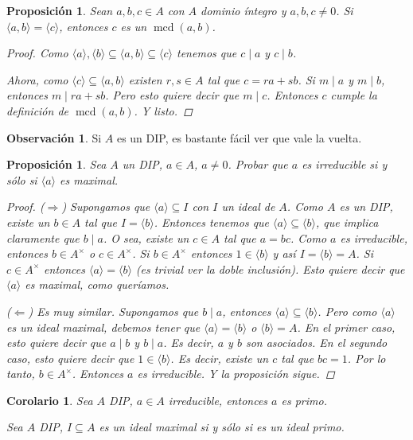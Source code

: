 \documentclass[12pt]{book}
\newtheorem{prop}[teo]{Proposición}
\newtheorem{cor}[teo]{Corolario}
\theoremstyle{definition}
\newtheorem{obs}[teo]{Observación}
\DeclareMathOperator{\mcd}{mcd}
\begin{document}
\begin{prop}
Sean $a,b,c\in A$ con $A$ dominio íntegro y $a,b,c\neq 0$. Si $\langle a,b\rangle = \langle c\rangle$, entonces $c$ es un $\mcd (a,b)$.
\begin{proof}
Como $\langle a\rangle , \langle b\rangle\subseteq \langle a,b\rangle \subseteq \langle c\rangle$ tenemos que $c\mid a$ y $c\mid b$.

Ahora, como $\langle c\rangle \subseteq \langle a,b\rangle$ existen $r,s\in A$ tal que $c=ra+sb$. Si $m\mid a$ y $m\mid b$, entonces $m\mid ra+sb$. Pero esto quiere decir que $m\mid c$. Entonces $c$ cumple la definición de $\mcd (a,b)$. Y listo.
\end{proof}
\end{prop}

\begin{obs}
Si $A$ es un DIP, es bastante fácil ver que vale la vuelta.
\end{obs}

\begin{prop}
Sea $A$ un DIP, $a\in A$, $a\neq 0$. Probar que $a$ es irreducible si y sólo si $\langle a\rangle$ es maximal.
\begin{proof}
($\Longrightarrow$) Supongamos que $\langle a\rangle \subseteq I$ con $I$ un ideal de $A$. Como $A$ es un DIP, existe un $b\in A$ tal que $I=\langle b\rangle$. Entonces tenemos que $\langle a\rangle \subseteq \langle b\rangle$, que implica claramente que $b\mid a$. O sea, existe un $c\in A$ tal que $a=bc$. Como $a$ es irreducible, entonces $b\in A^\times$ o $c\in A^\times$. Si $b\in A^\times$ entonces $1\in \langle b\rangle$ y así $I=\langle b\rangle = A$. Si $c\in A^\times$ entonces $\langle a\rangle =\langle b\rangle$ (es trivial ver la doble inclusión). Esto quiere decir que $\langle a\rangle$ es maximal, como queríamos.

($\Longleftarrow$) Es muy similar. Supongamos que $b\mid a$, entonces $\langle a\rangle \subseteq \langle b\rangle$. Pero como $\langle a\rangle$ es un ideal maximal, debemos tener que $\langle a\rangle=\langle b\rangle$ o $\langle b\rangle = A$. En el primer caso, esto quiere decir que $a\mid b$ y $b\mid a$. Es decir, $a$ y $b$ son asociados. En el segundo caso, esto quiere decir que $1\in \langle b\rangle$. Es decir, existe un $c$ tal que $bc=1$. Por lo tanto, $b\in A^\times$. Entonces $a$ es irreducible. Y la proposición sigue.
\end{proof}
\end{prop}

\begin{cor}
Sea $A$ DIP, $a\in A$ irreducible, entonces $a$ es primo.

Sea $A$ DIP, $I\subseteq A$ es un ideal maximal si y sólo si es un ideal primo.
\end{cor}
\end{document}
